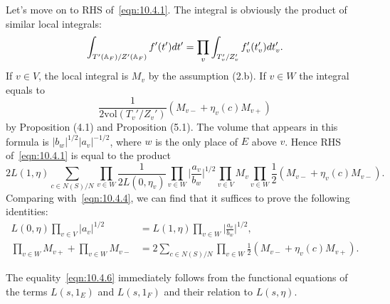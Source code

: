 Let's move on to RHS of~\eqref{eqn:10.4.1}.
The integral is obviously the product of similar local integrals:
\begin{equation*}
    \int_{T'(\mathbb{A}_F) / Z'(\mathbb{A}_F)} f'(t')dt' = \prod_{v} \int_{T_v' / Z_v'} f'_v(t_v') dt_v'.
\end{equation*}
If $v\in V$, the local integral is $M_v$ by the assumption (2.b).
If $v\in W$ the integral equals to
\begin{equation*}
    \frac{1}{2\mathrm{vol}(T_v'/Z_v')} (M_{v-} + \eta_v(c) M_{v+})
\end{equation*}
by Proposition (4.1) and Proposition (5.1).
The volume that appears in this formula is $|b_w|^{1/2}|a_v|^{-1/2}$, where $w$ is the only place of $E$ above $v$.
Hence RHS of~\eqref{eqn:10.4.1} is equal to the product
\begin{equation}
    2L(1,\eta) \sum_{c \in N(S)/N}\prod_{v\in W}\frac{1}{2L(0, \eta_v)} \prod_{v\in W} \bigg|\frac{a_v}{b_w}\bigg|^{1/2} \prod_{v\in V} M_v \prod_{v\in W} \frac{1}{2} (M_{v-} + \eta_v(c)M_{v-}).
\end{equation}
Comparing with~\eqref{eqn:10.4.4}, we can find that it suffices to prove the following identities:
\begin{align}
    L(0, \eta) \prod_{v\in V}|a_v|^{1/2} &= L(1, \eta) \prod_{v\in W} \bigg|\frac{a_v}{b_w}\bigg|^{1/2}, \label{eqn:10.4.6}\\
    \prod_{v\in W}M_{v+} + \prod_{v\in W} M_{v-} &= 2 \sum_{c \in N(S) / N} \prod_{v\in W} \frac{1}{2}(M_{v-} + \eta_v(c) M_{v+}). \label{eqn:10.4.7}
\end{align} 

The equality~\eqref{eqn:10.4.6} immediately follows from the functional equations of the terms $L(s, 1_E)$ and $L(s, 1_F)$ and their relation to $L(s, \eta)$.



